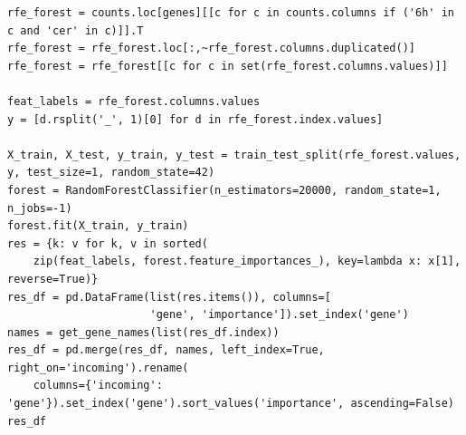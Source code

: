 \documentclass[11pt]{article}
\begin{document}
\begin{verbatim}
rfe_forest = counts.loc[genes][[c for c in counts.columns if ('6h' in c and 'cer' in c)]].T
rfe_forest = rfe_forest.loc[:,~rfe_forest.columns.duplicated()]
rfe_forest = rfe_forest[[c for c in set(rfe_forest.columns.values)]]

feat_labels = rfe_forest.columns.values
y = [d.rsplit('_', 1)[0] for d in rfe_forest.index.values]

X_train, X_test, y_train, y_test = train_test_split(rfe_forest.values, y, test_size=1, random_state=42)
forest = RandomForestClassifier(n_estimators=20000, random_state=1, n_jobs=-1)
forest.fit(X_train, y_train)
res = {k: v for k, v in sorted(
    zip(feat_labels, forest.feature_importances_), key=lambda x: x[1], reverse=True)}
res_df = pd.DataFrame(list(res.items()), columns=[
                      'gene', 'importance']).set_index('gene')
names = get_gene_names(list(res_df.index))
res_df = pd.merge(res_df, names, left_index=True, right_on='incoming').rename(
    columns={'incoming': 'gene'}).set_index('gene').sort_values('importance', ascending=False)
res_df
\end{verbatim}
\end{document}
